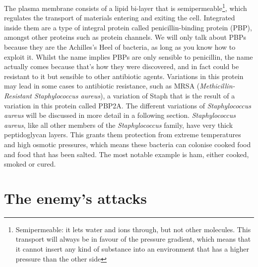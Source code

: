 The plasma membrane consists of a lipid bi-layer that is semipermeable\footnote{Semipermeable: it lets water and ions through, but not other molecules. This transport will always be in favour of the pressure gradient, which means that it cannot insert any kind of substance into an environment that has a higher pressure than the other side}, which regulates the transport of materials entering and exiting the cell. Integrated inside them are a type of integral protein called penicillin-binding protein (PBP), amongst other  proteins such as protein channels. We will only talk about PBPs because they are the Achilles's Heel of bacteria, as long as you know how to exploit it. Whilst the name implies PBPs are only sensible to penicillin, the name actually comes because that's how they were discovered, and in fact could be resistant to it but sensible to other antibiotic agents. Variations in this protein may lead in some cases to antibiotic resistance, such as MRSA (\emph{Methicillin-Resistant \emph{Staphylococcus aureus}}), a variation of Staph that is the result of a variation in this protein called PBP2A. The different variations of \emph{Staphylococcus aureus} will be discussed in more detail in a following section. \newline
\emph{Staphylococcus aureus}, like all other members of the \emph{Staphylococcus} family, have very thick peptidoglycan layers. This grants them protection from extreme temperatures and high osmotic pressures, which means these bacteria can colonise cooked food and food that has been salted. The most notable example is ham, either cooked, smoked or cured.
\section{The enemy's attacks}
